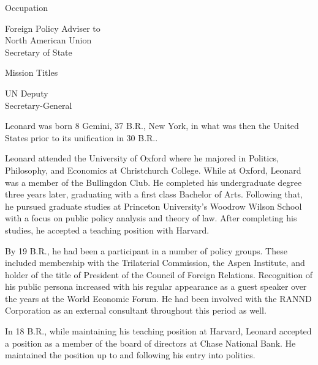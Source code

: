 {        \bTR
            \bTC Occupation \eTC
            \bTC 
                \startitemize[4]
                \startpacked
                \item Foreign Policy Adviser to\\North American Union\\Secretary of State
                \stoppacked
                \stopitemize
            \eTC
        \eTR
        
        \bTR
            \bTC Mission Titles \eTC
            \bTC 
                \startitemize[4]
                \startpacked
                \item UN Deputy\\Secretary-General
                \stoppacked
                \stopitemize
            \eTC            
        \eTR
    \eTABLEbody

\eTABLE
}

Leonard was born 8 Gemini, 37 B.R., New York, in what was then the United States prior to its unification in 30 B.R..

Leonard attended the University of Oxford where he majored in Politics, Philosophy, and Economics at Christchurch College. While at Oxford, Leonard was a member of the Bullingdon Club. He completed his undergraduate degree three years later, graduating with a first class Bachelor of Arts. Following that, he pursued graduate studies at Princeton University's Woodrow Wilson School with a focus on public policy analysis and theory of law. After completing his studies, he accepted a teaching position with Harvard.

By 19 B.R., he had been a participant in a number of policy groups. These included membership with the Trilaterial Commission, the Aspen Institute, and holder of the title of President of the Council of Foreign Relations. Recognition of his public persona increased with his regular appearance as a guest speaker over the years at the World Economic Forum. He had been involved with the RANND Corporation as an external consultant throughout this period as well.

In 18 B.R., while maintaining his teaching position at Harvard, Leonard accepted a position as a member of the board of directors at Chase National Bank. He maintained the position up to and following his entry into politics.

